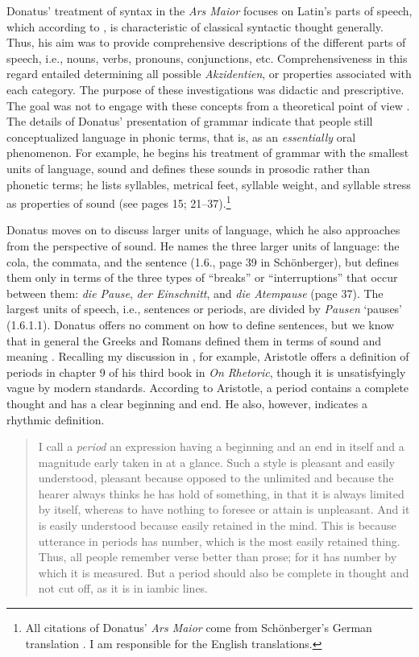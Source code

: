Donatus’ treatment of syntax in the \textit{Ars Maior} focuses on Latin’s parts of speech, which according to \citet[497]{Schönberger2010}, is characteristic of classical syntactic thought generally. Thus, his aim was to provide comprehensive descriptions of the different parts of speech, i.e., nouns, verbs, pronouns, conjunctions, etc. Comprehensiveness in this regard entailed determining all possible \textit{Akzidentien}, or properties associated with each category. The purpose of these investigations was didactic and prescriptive. The goal was not to engage with these concepts from a theoretical point of view \citep[497]{Schönberger2010}. The details of Donatus’ presentation of grammar indicate that people still conceptualized language in phonic terms, that is, as an \textit{essentially} oral phenomenon. For example, he begins his treatment of grammar with the smallest units of language, sound and defines these sounds in prosodic rather than phonetic terms; he lists syllables, metrical feet, syllable weight, and syllable stress as properties of sound (see pages 15; 21--37).\footnote{All citations of Donatus’ \textit{Ars Maior} come from Schönberger's German translation \citep{Schönberger2009}. I am responsible for the English translations.}

\begin{sloppypar}
Donatus moves on to discuss larger units of language, which he also approaches from the perspective of sound. He names the three larger units of language: the cola, the commata, and the sentence (1.6., page 39 in Schönberger), but defines them only in terms of the three types of “breaks” or “interruptions” that occur between them: \textit{die Pause}, \textit{der Einschnitt}, and \textit{die Atempause} (page 37). The largest units of speech, i.e., sentences or periods, are divided by \textit{Pausen} ‘pauses’ (1.6.1.1). Donatus offers no comment on how to define sentences, but we know that in general the Greeks and Romans defined them in terms of sound and meaning \citep[292]{Harrison2007}. Recalling my discussion in , for example, Aristotle offers a definition of periods in chapter 9 of his third book in \textit{On Rhetoric}, though it is unsatisfyingly vague by modern standards. According to Aristotle, a period contains a complete thought and has a clear beginning and end. He also, however, indicates a rhythmic definition.
\end{sloppypar}

\begin{quote}
I call a \textit{period} an expression having a beginning and an end in itself and a magnitude early taken in at a glance. Such a style is pleasant and easily understood, pleasant because opposed to the unlimited and because the hearer always thinks he has hold of something, in that it is always limited by itself, whereas to have nothing to foresee or attain is unpleasant. And it is easily understood because easily retained in the mind. This is because utterance in periods has number, which is the most easily retained thing. Thus, all people remember verse better than prose; for it has number by which it is measured. But a period should also be complete in thought and not cut off, as it is in iambic lines.
\end{quote}


